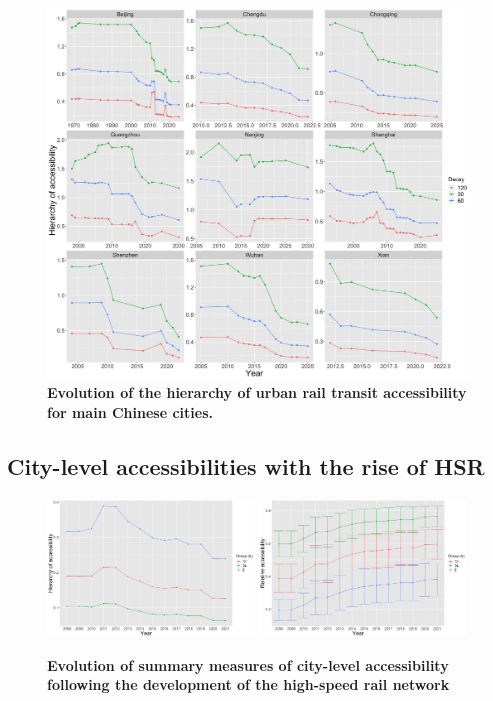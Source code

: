 \begin{figure}
	\includegraphics[width=\textwidth]{figures/accesshierarchy_facet.png}
	\caption{\textbf{Evolution of the hierarchy of urban rail transit accessibility for main Chinese cities.}\label{fig:tcaccess_hierarchy}}
\end{figure}



\subsection{City-level accessibilities with the rise of HSR}



\begin{figure}
	\includegraphics[width=0.49\textwidth]{figures/access_hierarchy.png}
	\includegraphics[width=0.49\textwidth]{figures/access_summary.png}
	\caption{\textbf{Evolution of summary measures of city-level accessibility following the development of the high-speed rail network}}
\end{figure}



